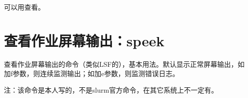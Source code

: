 \documentclass[a4paper,12pt,english]{sphinxmanual}
\begin{document}
\sphinxAtStartPar
可以用查看。


\section{查看作业屏幕输出：speek}
\label{\detokenize{slurm/slurm:speek}}
\sphinxAtStartPar
查看作业屏幕输出的命令（类似LSF的），基本用法。默认显示正常屏幕输出，如加\sphinxhyphen{}f参数，则连续监测输出；如加\sphinxhyphen{}e参数，则监测错误日志。

\sphinxAtStartPar
注：该命令是本人写的，不是slurm官方命令，在其它系统上不一定有。
\end{document}
